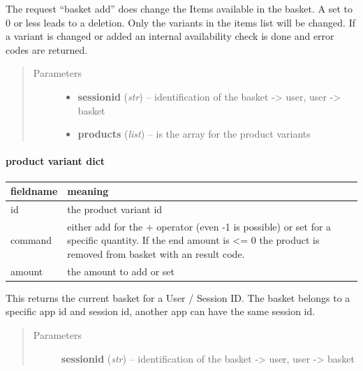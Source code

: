 \documentclass[letterpaper,10pt,english]{sphinxmanual}
\begin{document}
\begin{fulllineitems}
\begin{fulllineitems}
\label{collins:collins.Collins.basketadd}
The request ``basket add'' does change the Items available in the basket.
A set to 0 or less leads to a deletion. Only the variants in the items
list will be changed. If a variant is changed or added an internal
availability check is done and error codes are returned.
\begin{quote}\begin{description}
\item[{Parameters}] \leavevmode\begin{itemize}
\item {} 
\textbf{sessionid} (\emph{str}) -- identification of the basket -\textgreater{} user,
user -\textgreater{} basket

\item {} 
\textbf{products} (\emph{list}) -- is the array for the product variants

\end{itemize}

\end{description}\end{quote}
\paragraph{product variant dict}

\begin{tabulary}{\linewidth}{|L|L|}
\hline
\textsf{\relax 
fieldname
} & \textsf{\relax 
meaning
}\\
\hline
id
 & 
the product variant id
\\

command
 & 
either add for the + operator (even -1 is possible)
or set for a specific quantity.
If the end amount is \textless{}= 0 the product is
removed from basket with an result code.
\\

amount
 & 
the amount to add or set
\\
\hline\end{tabulary}


\end{fulllineitems}


\begin{fulllineitems}
\label{collins:collins.Collins.basketget}
This returns the current basket for a User / Session ID.
The basket belongs to a specific app id and session id,
another app can have the same session id.
\begin{quote}\begin{description}
\item[{Parameters}] \leavevmode
\textbf{sessionid} (\emph{str}) -- identification of the basket -\textgreater{} user,
user -\textgreater{} basket


\end{description}
\end{quote}
\end{fulllineitems}
\end{fulllineitems}
\end{document}
